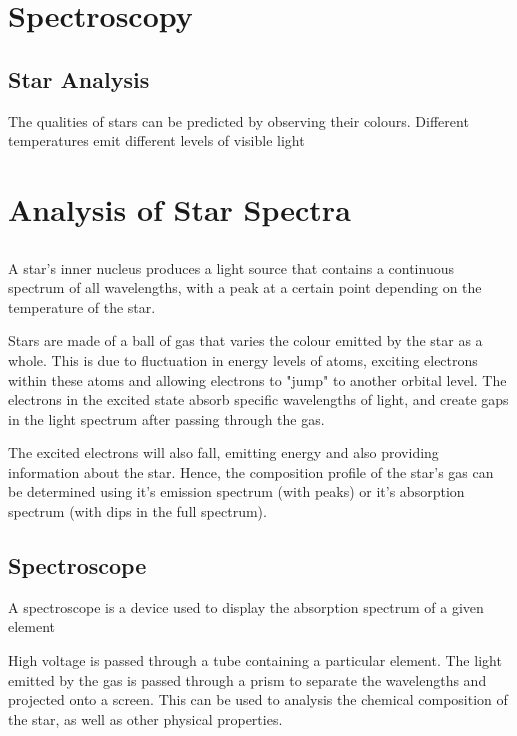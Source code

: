 \section{Spectroscopy} \label{08/05/2025}
	
	\subsection{Star Analysis}
	
		The qualities of stars can be predicted by observing their colours. Different temperatures emit different levels of visible light

\newpage

\section{Analysis of Star Spectra}

	\subsection{}

	A star's inner nucleus produces a light source that contains a continuous spectrum of all wavelengths, with a peak at a certain point depending on the temperature of the star.

	Stars are made of a ball of gas that varies the colour emitted by the star as a whole. This is due to fluctuation in energy levels of atoms, exciting electrons within these atoms and allowing electrons to "jump" to another orbital level. The electrons in the excited state absorb specific wavelengths of light, and create gaps in the light spectrum after passing through the gas.

	The excited electrons will also fall, emitting energy and also providing information about the star. Hence, the composition profile of the star's gas can be determined using it's emission spectrum (with peaks) or it's absorption spectrum (with dips in the full spectrum).

	\subsection{Spectroscope}
	
		A spectroscope is a device used to display the absorption spectrum of a given element

		High voltage is passed through a tube containing a particular element. The light emitted by the gas is passed through a prism to separate the wavelengths and projected onto a screen. This can be used to analysis the chemical composition of the star, as well as other physical properties.

